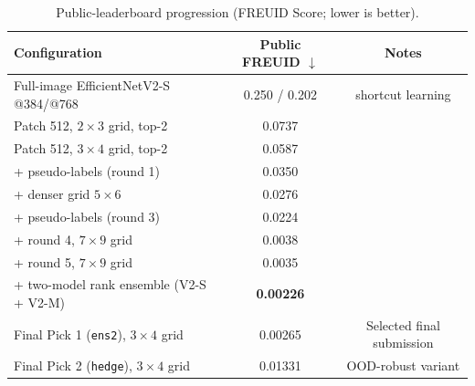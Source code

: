 \documentclass[11pt,a4paper]{article}
\begin{document}
\begin{table}[h]
  \centering
  \caption{Public-leaderboard progression (FREUID Score; lower is better).}
  \label{tab:results}
  \begin{tabular}{lcc}
    \toprule
    Configuration & Public FREUID $\downarrow$ & Notes \\
    \midrule
    Full-image EfficientNetV2-S @384/@768        & 0.250 / 0.202 & shortcut learning \\
    Patch 512, $2{\times}3$ grid, top-2          & 0.0737 & \\
    Patch 512, $3{\times}4$ grid, top-2          & 0.0587 & \\
    + pseudo-labels (round 1)                    & 0.0350 & \\
    + denser grid $5{\times}6$                   & 0.0276 & \\
    + pseudo-labels (round 3)                    & 0.0224 & \\
    + round 4, $7{\times}9$ grid                 & 0.0038 & \\
    + round 5, $7{\times}9$ grid                 & 0.0035 & \\
    + two-model rank ensemble (V2-S + V2-M)      & \textbf{0.00226} & \\
    Final Pick 1 (\texttt{ens2}), $3{\times}4$ grid  & 0.00265 & Selected final submission \\
    Final Pick 2 (\texttt{hedge}), $3{\times}4$ grid & 0.01331 & OOD-robust variant \\
    \bottomrule
  \end{tabular}
\end{table}
\end{document}
